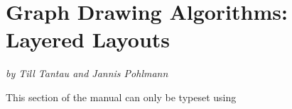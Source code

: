 %
%
%


\section{Graph Drawing Algorithms: Layered Layouts}

{\emph{by Till Tantau and Jannis Pohlmann}}

\ifluatex
\else
    This section of the manual can only be typeset using 
    \expandafter\endinput
\fi

\includeluadocumentationof{pgf.gd.layered.library}
\includeluadocumentationof{pgf.gd.layered.Sugiyama}
\includeluadocumentationof{pgf.gd.layered.cycle_removal}
\includeluadocumentationof{pgf.gd.layered.node_ranking}
\includeluadocumentationof{pgf.gd.layered.crossing_minimization}
\includeluadocumentationof{pgf.gd.layered.node_positioning}
\includeluadocumentationof{pgf.gd.layered.edge_routing}



